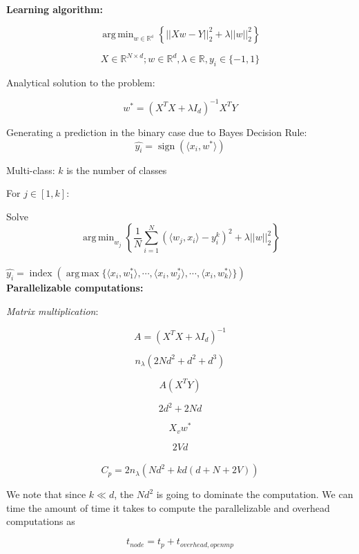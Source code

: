 \documentclass[article,12pt]{article}
\DeclareMathOperator*{\argmin}{arg\,min}
\DeclareMathOperator*{\argmax}{arg\,max}
\DeclareMathOperator{\sign}{sign}
\DeclareMathOperator{\ind}{index}
\begin{document}
\textbf{Learning algorithm:}

$$ \argmin_{w \in \mathbb{R^d}} \left\{ ||Xw - Y||_2^2 + \lambda ||w||_2^2 \right\}$$

$$ X \in \mathbb{R}^{N \times d}; w \in \mathbb{R}^d, \lambda \in \mathbb{R}, y_i \in \{-1, 1\}$$

Analytical solution to the problem:

$$ w^* = \left(X^TX + \lambda I_d\right)^{-1} X^T Y$$

Generating a prediction in the binary case due to Bayes Decision Rule:
$$ \hat{y_i} = \sign(\langle x_i, w^* \rangle)$$

Multi-class: $k$ is the number of classes

For $j \in [1, k]$:

Solve 
$$ \argmin_{w_j} \left\{ \frac{1}{N} \sum_{i=1}^N (\langle w_j, x_i \rangle  - y_i^k)^2 + \lambda || w ||_2^2 \right\}$$\\

$\hat{y_i} = \ind \left(\argmax \{ \langle x_i,w_1^* \rangle, \cdots, \langle x_i,w_j^*\rangle, \cdots, \langle x_i,w_k^*\rangle\}\right)$\\

\textbf{Parallelizable computations:}

\textit{Matrix multiplication}:

$$ A = (X^TX + \lambda I_d)^{-1}$$


$$ n_{\lambda}(2Nd^2 + d^2 + d^3) $$



$$ A(X^TY) $$

$$ 2d^2 + 2Nd$$


$$ X_v w^* $$

$$ 2Vd $$\\


$$C_p = 2n_{\lambda}(Nd^2 + kd(d + N + 2V))$$

We note that since $k \ll d$, the $Nd^2$ is going to dominate the computation. We can time the amount of time it takes to compute the parallelizable and overhead computations as 

$$t_{node} = t_p + t_{overhead, openmp}$$
\end{document}
